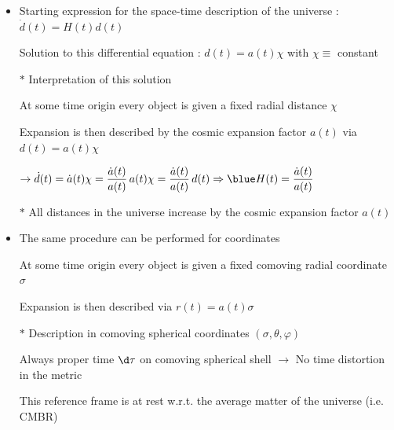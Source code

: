 \Tr
\begin{itemize}
\item Starting expression for the space-time description of the universe : {\blue $\dot{d}(t)=H(t)d(t)$}
\item[] Solution to this differential equation : {\blue $d(t)=a(t)\chi$} with {\blue $\chi \equiv$ constant}
\item[$\ast$] Interpretation of this solution
\item[] At some time origin every object is given a {\blue fixed radial distance $\chi$}
\item[] Expansion is then described by the {\blue cosmic expansion factor $a(t)$} via $d(t)=a(t)\chi$
\item[] $\displaystyle \rightarrow \dot{d}(t)=\dot{a}(t)\chi=\frac{\dot{a}(t)}{a(t)}\,a(t)\chi
         =\frac{\dot{a}(t)}{a(t)}\,d(t) \Rightarrow {\blue H(t)=\frac{\dot{a}(t)}{a(t)}}$
\item[$\ast$] {\red All distances in the universe increase by the cosmic expansion factor $a(t)$}
\item The same procedure can be performed for coordinates
\item[] At some time origin every object is given a {\blue fixed comoving radial coordinate $\sigma$}
\item[] Expansion is then described via {\blue $r(t)=a(t)\sigma$}
\item[$\ast$] Description in {\blue comoving spherical coordinates $(\sigma,\theta,\varphi)$}
\item[] Always proper time $\d\tau$ on comoving spherical shell $\rightarrow$
        {\blue No time distortion in the metric}
\item[] This reference frame is at rest w.r.t. the average matter of the universe (i.e. CMBR)
\end{itemize}


